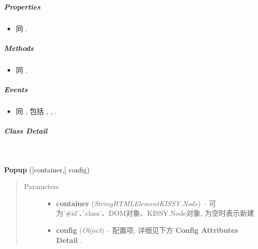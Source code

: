\documentclass[letterpaper,10pt,english]{sphinxmanual}
\begin{document}
\subparagraph{Properties}
\label{api/component/overlay/popup:properties}\begin{itemize}
\item {}
同 {\hyperref[api/component/overlay/popup:module-Overlay]{}} .

\end{itemize}


\subparagraph{Methods}
\label{api/component/overlay/popup:methods}\begin{itemize}
\item {}
同 {\hyperref[api/component/overlay/popup:module-Overlay]{}} .

\end{itemize}


\subparagraph{Events}
\label{api/component/overlay/popup:events}\begin{itemize}
\item {}
同 {\hyperref[api/component/overlay/popup:module-Overlay]{}} , 包括 {\hyperref[api/component/overlay/overlay:Overlay.show]{}} , {\hyperref[api/component/overlay/overlay:Overlay.hide]{}} , {\hyperref[api/component/overlay/overlay:Overlay.beforeVisibleChange]{}} .

\end{itemize}


\subparagraph{Class Detail}
\label{api/component/overlay/popup:class-detail}

\begin{fulllineitems}
\label{api/component/overlay/popup:Overlay.Popup}~
\begin{DUlineblock}{0em}
\item[] \textbf{Popup} ({[}container,{]} config)
\end{DUlineblock}
\begin{quote}\begin{description}
\item[{Parameters}] \leavevmode\begin{itemize}
\item {}
\textbf{container} (\emph{String\textbar{}HTMLElement\textbar{}KISSY.Node}) -- 可为'\#id'、'.class'、DOM对象、KISSY.Node对象, 为空时表示新建

\item {}
\textbf{config} (\emph{Object}) -- 配置项, 详细见下方 \textbf{Config Attributes Detail} .

\end{itemize}

\end{description}\end{quote}

\end{fulllineitems}
\end{document}
